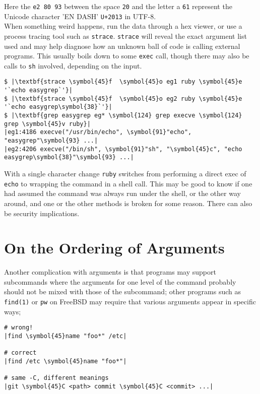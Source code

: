 \documentclass[10pt,a4paper]{article}
\begin{document}
Here the \texttt{e2 80 93} between the space \texttt{20} and the
letter a \texttt{61} represent the Unicode character 'EN DASH'
\texttt{U+2013} in UTF-8. \\

When something weird happens, run the data through a hex viewer, or use
a process tracing tool such as \texttt{strace}. \texttt{strace} will
reveal the exact argument list used and may help diagnose how an unknown
ball of code is calling external programs. This usually boils down to
some \texttt{exec} call, though there may also be calls to \texttt{sh}
involved, depending on the input.

\begin{lstlisting}
$ |\textbf{strace \symbol{45}f  \symbol{45}o eg1 ruby \symbol{45}e '`echo easygrep`'}|
$ |\textbf{strace \symbol{45}f  \symbol{45}o eg2 ruby \symbol{45}e '`echo easygrep\symbol{38}`'}|
$ |\textbf{grep easygrep eg* \symbol{124} grep execve \symbol{124} grep \symbol{45}v ruby}|
|eg1:4186 execve("/usr/bin/echo", \symbol{91}"echo", "easygrep"\symbol{93} ...|
|eg2:4206 execve("/bin/sh", \symbol{91}"sh", "\symbol{45}c", "echo easygrep\symbol{38}"\symbol{93} ...|
\end{lstlisting}

With a single character change \texttt{ruby} switches from performing a
direct exec of \texttt{echo} to wrapping the command in a shell call.
This may be good to know if one had assumed the command was always run
under the shell, or the other way around, and one or the other methods
is broken for some reason. There can also be security implications.

\section*{On the Ordering of Arguments}

Another complication with arguments is that programs may support
subcommands where the arguments for one level of the command probably
should not be mixed with those of the subcommand; other programs such as
\texttt{find(1)} or \texttt{pw} on FreeBSD may require that various
arguments appear in specific ways;

\begin{lstlisting}
# wrong!
|find \symbol{45}name "foo*" /etc|

# correct
|find /etc \symbol{45}name "foo*"|

# same -C, different meanings
|git \symbol{45}C <path> commit \symbol{45}C <commit> ...|
\end{lstlisting}
\end{document}
